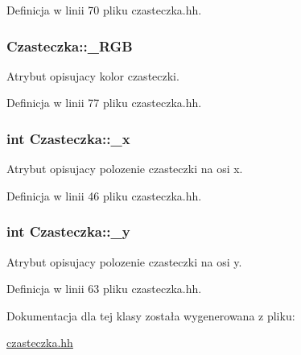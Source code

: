 Definicja w linii 70 pliku czasteczka.\-hh.

\hypertarget{class_czasteczka_ab9c93cfb3cf0360579ad0def2a94178c}{
\subsubsection[{\-\_\-\-R\-G\-B}]{ Czasteczka\-::\-\_\-\-R\-G\-B}}\label{class_czasteczka_ab9c93cfb3cf0360579ad0def2a94178c}
Atrybut opisujacy kolor czasteczki. 

Definicja w linii 77 pliku czasteczka.\-hh.

\hypertarget{class_czasteczka_af809cd4fb1651ebf4b5980ee38c68e58}{
\subsubsection[{\-\_\-x}]{\setlength{\rightskip}{0pt plus 5cm}int Czasteczka\-::\-\_\-x}}\label{class_czasteczka_af809cd4fb1651ebf4b5980ee38c68e58}
Atrybut opisujacy polozenie czasteczki na osi x. 

Definicja w linii 46 pliku czasteczka.\-hh.

\hypertarget{class_czasteczka_a285d25465eee101b6af073809e2fee00}{
\subsubsection[{\-\_\-y}]{\setlength{\rightskip}{0pt plus 5cm}int Czasteczka\-::\-\_\-y}}\label{class_czasteczka_a285d25465eee101b6af073809e2fee00}
Atrybut opisujacy polozenie czasteczki na osi y. 

Definicja w linii 63 pliku czasteczka.\-hh.



Dokumentacja dla tej klasy została wygenerowana z pliku\-:\begin{DoxyCompactItemize}
\item 
\hyperlink{czasteczka_8hh}{czasteczka.\-hh}\end{DoxyCompactItemize}

